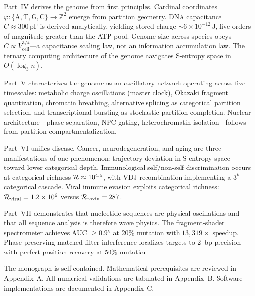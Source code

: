 Part~IV derives the genome from first principles. Cardinal coordinates $\varphi: \{\mathrm{A,T,G,C}\}
\to \mathbb{Z}^2$ emerge from partition geometry. DNA capacitance $C \approx 300\,\mathrm{pF}$
is derived analytically, yielding stored charge $\sim 6 \times 10^{-12}\,\mathrm{J}$, five
orders of magnitude greater than the ATP pool. Genome size across species obeys $C \propto
V_{\mathrm{cell}}^{3/4}$---a capacitance scaling law, not an information accumulation law.
The ternary computing architecture of the genome navigates S-entropy space in $O(\log_3 n)$.

Part~V characterizes the genome as an oscillatory network operating across five timescales:
metabolic charge oscillations (master clock), Okazaki fragment quantization, chromatin breathing,
alternative splicing as categorical partition selection, and transcriptional bursting as
stochastic partition completion. Nuclear architecture---phase separation, NPC gating, heterochromatin
isolation---follows from partition compartmentalization.

Part~VI unifies disease. Cancer, neurodegeneration, and aging are three manifestations of one
phenomenon: trajectory deviation in S-entropy space toward lower categorical depth. Immunological
self/non-self discrimination occurs at categorical richness $\mathcal{R} \approx 10^{4.5}$, with VDJ
recombination implementing a $3^k$ categorical cascade. Viral immune evasion exploits categorical
richness: $\mathcal{R}_{\mathrm{viral}} = 1.2 \times 10^6$ versus $\mathcal{R}_{\mathrm{toxin}} = 287$.

Part~VII demonstrates that nucleotide sequences are physical oscillations and that all sequence
analysis is therefore wave physics. The fragment-shader spectrometer achieves AUC $\geq 0.97$
at 20\% mutation with $13{,}319 \times$ speedup. Phase-preserving matched-filter interference
localizes targets to 2~bp precision with perfect position recovery at 50\% mutation.

The monograph is self-contained. Mathematical prerequisites are reviewed in Appendix~A. All
numerical validations are tabulated in Appendix~B. Software implementations are documented
in Appendix~C.
